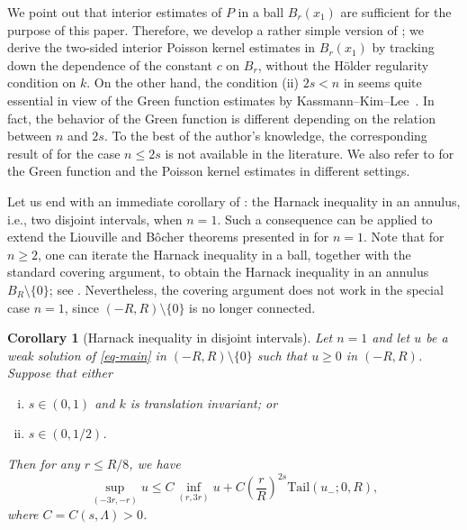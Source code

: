 \documentclass[11pt]{amsart}
\theoremstyle{plain}
\newtheorem{corollary}[theorem]{Corollary}
\theoremstyle{definition}
\numberwithin{equation}{section}
\begin{document}
We point out that interior estimates of $P$ in a ball $B_r(x_1)$ are sufficient for the purpose of this paper. Therefore, we develop a rather simple version of ; we derive the two-sided interior Poisson kernel estimates in $B_r(x_1)$ by tracking down the dependence of the constant $c$ on $B_r$, without the H\"older regularity condition on $k$. On the other hand, the condition (ii) $2s<n$ in  seems quite essential in view of the Green function estimates by Kassmann--Kim--Lee~\cite{KKL23}. In fact, the behavior of the Green function is different depending on the relation between $n$ and $2s$. To the best of the author's knowledge, the corresponding result of \cite{KKL23} for the case $n \leq 2s$ is not available in the literature. We also refer to \cite{Buc16, CKS10, CS98, CS04, FRRO24, KM14} for the Green function and the Poisson kernel estimates in different settings.\newline

Let us end with an immediate corollary of : the Harnack inequality in an annulus, i.e., two disjoint intervals, when $n=1$. Such a consequence can be applied to extend the Liouville and B\^ocher theorems presented in \cite{KL25} for $n=1$. Note that for $n \geq 2$, one can iterate the Harnack inequality in a ball, together with the standard covering argument, to obtain the Harnack inequality in an annulus $B_R \setminus \{0\}$; see . Nevertheless, the covering argument does not work in the special case $n=1$, since $(-R, R) \setminus \{0\}$ is no longer connected.

\begin{corollary}[Harnack inequality in disjoint intervals]\label{cor-Harnack-annulus}
   Let $n=1$ and let $u$ be a weak solution of \eqref{eq-main} in $(-R, R)\setminus\{0\}$ such that $u \geq 0$ in $(-R, R)$. Suppose that either
    \begin{enumerate}[(i)]
        \item $s \in (0, 1)$ and $k$ is translation invariant; or
        
        \item $s \in (0, 1/2)$.
    \end{enumerate}    
   Then for any $r \leq R/8$, we have
    \begin{equation*}
        \sup_{(-3r, -r)}u \leq C \inf_{(r, 3r)}u +C\left(\frac{r}{R}\right)^{2s} \mathrm{Tail}(u_-; 0, R),
    \end{equation*}
    where $C=C(s, \Lambda)>0$.
\end{corollary}
\end{document}
